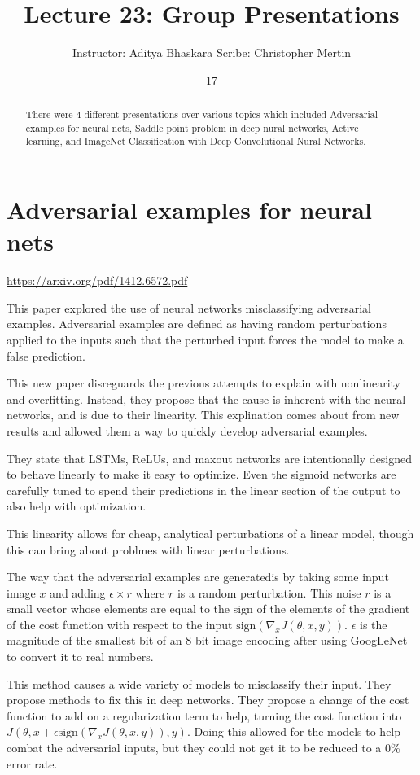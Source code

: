 \documentclass[english,course]{Notes}
\title{Lecture 23: Group Presentations}
\author{Instructor: Aditya Bhaskara \qquad Scribe: Christopher Mertin}
\date{17}{04}{2017}
\begin{document}
\vspace{-10pt}
\begin{abstract}
There were 4 different presentations over various topics which included Adversarial examples for neural nets, Saddle point problem in deep nural networks, Active learning, and ImageNet Classification with Deep Convolutional Nural Networks.
\end{abstract}

\section{Adversarial examples for neural nets}

\url{https://arxiv.org/pdf/1412.6572.pdf}

This paper explored the use of neural networks misclassifying adversarial examples. Adversarial examples are defined as having random perturbations applied to the inputs such that the perturbed input forces the model to make a false prediction.

This new paper disreguards the previous attempts to explain with nonlinearity and overfitting. Instead, they propose that the cause is inherent with the neural networks, and is due to their linearity. This explination comes about from new results and allowed them a way to quickly develop adversarial examples. 

They state that LSTMs, ReLUs, and maxout networks are intentionally designed to behave linearly to make it easy to optimize. Even the sigmoid networks are carefully tuned to spend their predictions in the linear section of the output to also help with optimization. 

This linearity allows for cheap, analytical perturbations of a linear model, though this can bring about problmes with linear perturbations. 

The way that the adversarial examples are generatedis by taking some input image $x$ and adding $\epsilon \times r$ where $r$ is a random perturbation. This noise $r$ is a small vector whose elements are equal to the sign of the elements of the gradient of the cost function with respect to the input $\text{sign} \left( \nabla_{x}J(\theta , x, y)\right)$. $\epsilon$ is the magnitude of the smallest bit of an 8 bit image encoding after using GoogLeNet to convert it to real numbers.

This method causes a wide variety of models to misclassify their input. They propose methods to fix this in deep networks. They propose a change of the cost function to add on a regularization term to help, turning the cost function into $J(\theta,x + \epsilon \text{sign}(\nabla_{x}J(\theta,x,y)), y)$. Doing this allowed for the models to help combat the adversarial inputs, but they could not get it to be reduced to a 0\% error rate. 
\end{document}
